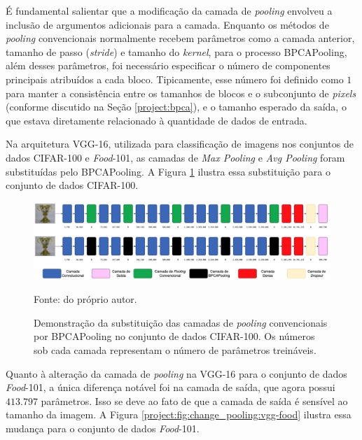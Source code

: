 É fundamental salientar que a modificação da camada de \textit{pooling} envolveu a inclusão de argumentos adicionais para a camada. Enquanto os métodos de \textit{pooling} convencionais normalmente recebem parâmetros como a camada anterior, tamanho de passo (\textit{stride}) e tamanho do \textit{kernel}, para o processo BPCAPooling, além desses parâmetros, foi necessário especificar o número de componentes principais atribuídos a cada bloco. Tipicamente, esse número foi definido como $1$ para manter a consistência entre os tamanhos de blocos e o subconjunto de \textit{pixels} (conforme discutido na Seção \ref{project:bpca}), e o tamanho esperado da saída, o que estava diretamente relacionado à quantidade de dados de entrada.

Na arquitetura VGG-16, utilizada para classificação de imagens nos conjuntos de dados CIFAR-100 e \textit{Food}-101, as camadas de \textit{Max Pooling} e \textit{Avg Pooling} foram substituídas pelo BPCAPooling. A Figura \ref{project:fig:change_pooling:vgg-cifar} ilustra essa substituição para o conjunto de dados CIFAR-100.

\begin{figure}[H]
    \centering
    \caption[Substituição das camadas de \textit{pooling} por BPCAPooling - CIFAR-100.]{Demonstração da substituição das camadas de \textit{pooling} convencionais por BPCAPooling no conjunto de dados CIFAR-100. Os números sob cada camada representam o número de parâmetros treináveis.}
    \includegraphics[width=1\textwidth]{recursos/imagens/project/vgg-with-bpca-cifar.png}
    \label{project:fig:change_pooling:vgg-cifar}

    Fonte: do próprio autor.
\end{figure}


Quanto à alteração da camada de \textit{pooling} na VGG-16 para o conjunto de dados \textit{Food}-101, a única diferença notável foi na camada de saída, que agora possui $413.797$ parâmetros. Isso se deve ao fato de que a camada de saída é sensível ao tamanho da imagem. A Figura \ref{project:fig:change_pooling:vgg-food} ilustra essa mudança para o conjunto de dados \textit{Food}-101.

